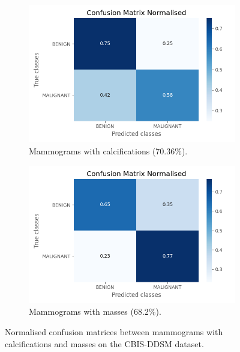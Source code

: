 \begin{figure}[h]
\centering
\begin{subfigure}{.5\textwidth}
  \centering
  \includegraphics[width=\textwidth]{Dissertation/figures/evaluation/common/CM-norm_basic-model_CBIS-DDSM-dataset-Calc.png}
  \caption{Mammograms with calcifications (70.36\%).}
  \label{fig:evaluation-cbisddsm-common-calc}
\end{subfigure}%
\begin{subfigure}{.5\textwidth}
  \centering
  \includegraphics[width=\textwidth]{Dissertation/figures/evaluation/common/CM-norm_basic-model_CBIS-DDSM-dataset-Mass.png}
  \caption{Mammograms with masses (68.2\%).}
  \label{fig:evaluation-cbisddsm-common-mass}
\end{subfigure}
\caption{\label{fig:evaluation-cbisddsm-common-mass-vs-calc}Normalised confusion matrices between mammograms with calcifications and masses on the CBIS-DDSM dataset.}
\end{figure}

